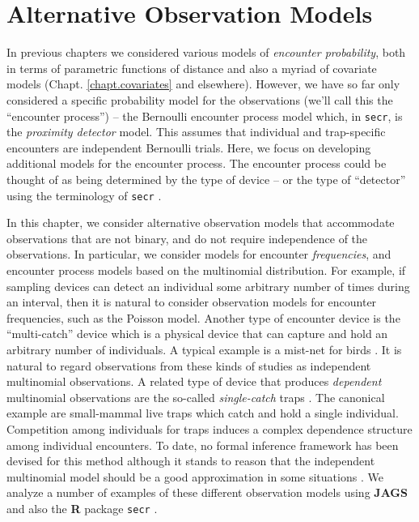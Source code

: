 \chapter{Alternative Observation Models}
\label{chapt.poisson-mn}

\vspace{.3in}



In previous chapters we considered various models of {\it encounter
  probability}, both in terms of parametric functions of distance and
also a myriad of covariate models (Chapt. \ref{chapt.covariates} and
elsewhere).  However, we have so far only considered a specific
probability model for the observations (we'll call this the
``encounter process'') -- the Bernoulli encounter process model which,
in \mbox{\tt secr}, is the {\it proximity detector} model. This
assumes that individual and trap-specific encounters are independent
Bernoulli trials.  Here, we focus on developing additional models for
the encounter process.  The encounter process could be thought of as
being determined by the type of device -- or the type of ``detector''
using the terminology of \mbox{\tt secr} \citep{efford:2011}.

In this chapter, we consider alternative observation models that
accommodate observations that are not binary, and do not require
independence of the observations.  In particular, we consider models
for encounter {\it frequencies}, and encounter process models based on
the multinomial distribution. For example, if sampling devices can
detect an individual some arbitrary number of times during an
interval, then it is natural to consider observation models for
encounter frequencies, such as the Poisson model. Another type of
encounter device is the ``multi-catch'' device
\citep{efford_etal:2009euring} which is a physical device that can
capture and hold an arbitrary number of individuals. A typical example
is a mist-net for birds \citep{borchers_efford:2008}.  It is natural
to regard observations from these kinds of studies as independent
multinomial observations.  A related type of device that produces {\it
  dependent} multinomial observations are the so-called {\it
  single-catch} traps \citep{efford:2004, efford_etal:2009euring}. The
canonical example are small-mammal live traps which catch and hold a
single individual. Competition among individuals for traps induces a
complex dependence structure among individual encounters. To date, no
formal inference framework has been devised for this method although
it stands to reason that the independent multinomial model should be a
good approximation in some situations \citep{efford_etal:2009euring}.
We analyze a number of examples of these different observation models
using {\bf JAGS} and also the {\bf R} package \mbox{\tt secr}
\citep{efford:2011}.




